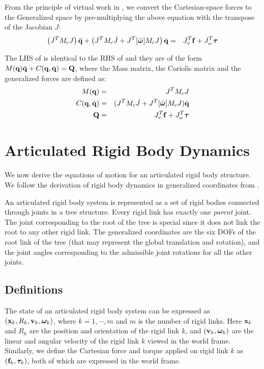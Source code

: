 From the principle of virtual work in , we convert the Cartesian-space forces to the Generalized space by pre-multiplying the above equation with the transpose of the Jacobian $J$:
\begin{eqnarray}
\label{eq:dyngen_vec2}
\left (J^T M_c J \right ) \ddot{\mathbf{q}} + \left (J^T M_c \dot{J} + J^T [\tilde{\bm{\omega}}]M_c J \right ) \dot{\mathbf{q}} & = & J_v^T \mathbf{f} + J_\omega^T \bm{\tau}
\end{eqnarray}

The LHS of  is identical to the RHS of  and they are of the form $M(\mathbf{q})\ddot{\mathbf{q}} + C(\mathbf{q},\dot{\mathbf{q}}) = \mathbf{Q}$, where the Mass matrix, the Coriolis matrix and the generalized forces are defined as:
\begin{eqnarray}
\nonumber
M(\mathbf{q}) & = & J^T M_c J\\
\nonumber
C(\mathbf{q},\dot{\mathbf{q}}) & = & (J^T M_c \dot{J} + J^T [\tilde{\bm{\omega}}]M_c J)\dot{\mathbf{q}}\\
\mathbf{Q} & = & J_v^T \mathbf{f} + J_\omega^T \bm{\tau}
\end{eqnarray}

\section{Articulated Rigid Body Dynamics}
We now derive the equations of motion for an articulated rigid body structure. We follow the derivation of rigid body dynamics in generalized coordinates from .

An articulated rigid body system is represented as a set of rigid bodies connected through joints in a tree structure. Every rigid link has exactly one \emph{parent} joint. The joint corresponding to the root of the tree is special since it does not link the root to any other rigid link. The generalized coordinates are the six DOFs of the root link of the tree (that may represent the global translation and rotation), and the joint angles corresponding to the admissible joint rotations for all the other joints. 

\subsection{Definitions}
The state of an articulated rigid body
system can be expressed as $(\mathbf{x}_k, R_k, \mathbf{v}_k,
\boldsymbol{\bm{\omega}}_k)$, where $k = 1, \cdots, m$ and $m$ is the number of rigid links. Here $\mathbf{x}_k$ and
$R_k$ are the position and orientation of the rigid link $k$, and $(\mathbf{v}_k,
{\bm{\omega}}_k)$ are the linear and angular velocity of the
rigid link $k$ viewed in the world frame. Similarly, we define the
Cartesian force and torque applied on rigid link $k$ as $(\mathbf{f}_k,
{\bm{\tau}}_k)$, both of which are expressed in the world
frame.

